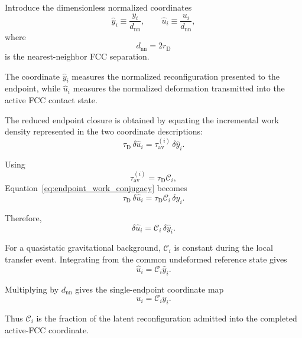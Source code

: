 Introduce the dimensionless normalized coordinates
\begin{equation}
    \widehat{y}_{i} \equiv \frac{y_{i}}{d_{\mathrm{nn}}}, \qquad \widehat{u}_{i} \equiv \frac{u_{i}}{d_{\mathrm{nn}}},
\end{equation}
where
\begin{equation}
    d_{\mathrm{nn}} = 2r_{\mathrm{D}}
\end{equation}
is the nearest-neighbor FCC separation.

The coordinate $\widehat{y}_{i}$ measures the normalized reconfiguration presented to the endpoint, while $\widehat{u}_{i}$ measures the normalized deformation transmitted into the active FCC contact state.

The reduced endpoint closure is obtained by equating the incremental work density represented in the two coordinate descriptions:
\begin{equation}
    \tau_{\mathrm{D}}\,\delta\widehat{u}_{i} = \tau_{\mathrm{av}}^{(i)}\,\delta\widehat{y}_{i}.
    \label{eq:endpoint_work_conjugacy}
\end{equation}

Using
\begin{equation}
    \tau_{\mathrm{av}}^{(i)} = \tau_{\mathrm{D}}\mathcal{C}_{i},
\end{equation}
Equation~\eqref{eq:endpoint_work_conjugacy} becomes
\begin{equation}
    \tau_{\mathrm{D}}\,\delta\widehat{u}_{i} = \tau_{\mathrm{D}}\mathcal{C}_{i}\,\delta\widehat{y}_{i}.
\end{equation}

Therefore,
\begin{equation}
    \delta\widehat{u}_{i} = \mathcal{C}_{i}\,\delta\widehat{y}_{i}.
\end{equation}

For a quasistatic gravitational background, $\mathcal{C}_{i}$ is constant during the local transfer event. Integrating from the common undeformed reference state gives
\begin{equation}
    \widehat{u}_{i} = \mathcal{C}_{i}\widehat{y}_{i}.
\end{equation}

Multiplying by $d_{\mathrm{nn}}$ gives the single-endpoint coordinate map
\begin{equation}
    u_{i} = \mathcal{C}_{i}y_{i}.
    \label{eq:single_endpoint_coordinate_map}
\end{equation}

Thus $\mathcal{C}_{i}$ is the fraction of the latent reconfiguration admitted into the completed active-FCC coordinate.

